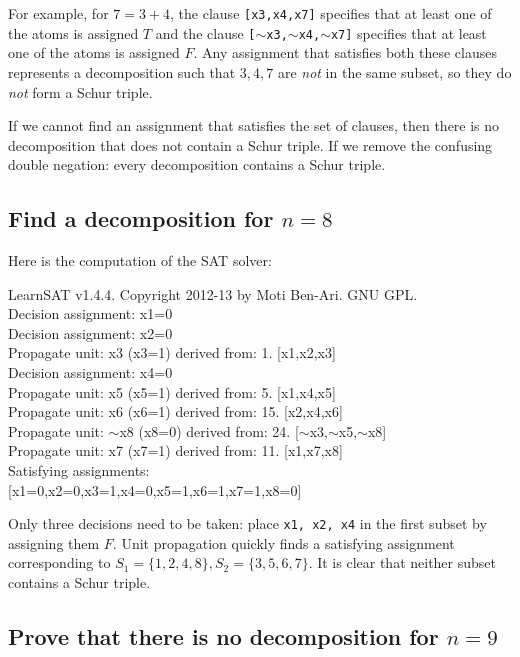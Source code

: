 \documentclass[11pt,a4paper]{article}
\begin{document}
For example, for $7=3+4$, the clause \texttt{[x3,x4,x7]} specifies that at least one of the atoms is assigned $T$ and the clause \texttt{[$\sim$x3,$\sim$x4,$\sim$x7]} specifies that at least one of the atoms is assigned $F$. Any assignment that satisfies both these clauses represents a decomposition such that $3,4,7$ are \emph{not} in the same subset, so they do \emph{not} form a Schur triple.

If we cannot find an assignment that satisfies the set of clauses, then there is no decomposition that does not contain a Schur triple. If we remove the confusing double negation: every decomposition contains a Schur triple.

\subsection*{Find a decomposition for $n=8$}

Here is the computation of the SAT solver:

\begin{ttfamily}
LearnSAT v1.4.4. Copyright 2012-13 by Moti Ben-Ari. GNU GPL.\\
Decision assignment: x1=0\\
Decision assignment: x2=0\\
Propagate unit:  x3 (x3=1) derived from: 1. [x1,x2,x3]\\
Decision assignment: x4=0\\
Propagate unit:  x5 (x5=1) derived from: 5. [x1,x4,x5]\\
Propagate unit:  x6 (x6=1) derived from: 15. [x2,x4,x6]\\
Propagate unit: $\sim$x8 (x8=0) derived from: 24. [$\sim$x3,$\sim$x5,$\sim$x8]\\
Propagate unit:  x7 (x7=1) derived from: 11. [x1,x7,x8]\\
Satisfying assignments:\\
{[}x1=0,x2=0,x3=1,x4=0,x5=1,x6=1,x7=1,x8=0]
\end{ttfamily}

Only three decisions need to be taken: place \texttt{x1, x2, x4} in the first subset by assigning them $F$. Unit propagation quickly finds a satisfying assignment corresponding to $S_1=\{1,2,4,8\}, S_2=\{3,5,6,7\}$. It is clear that neither subset contains a Schur triple.

\subsection*{Prove that there is no decomposition for $n=9$}
\end{document}
